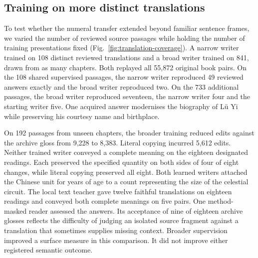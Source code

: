 \subsection*{Training on more distinct translations}
To test whether the numeral transfer extended beyond familiar sentence frames, we varied the number of reviewed source passages while holding the number of training presentations fixed (Fig.~\ref{fig:translation-coverage}). A narrow writer trained on 108 distinct reviewed translations and a broad writer trained on 841, drawn from as many chapters. Both replayed all 55,872 original book pairs. On the 108 shared supervised passages, the narrow writer reproduced 49 reviewed answers exactly and the broad writer reproduced two. On the 733 additional passages, the broad writer reproduced seventeen, the narrow writer four and the starting writer five. One acquired answer modernises the biography of L\"u Yi while preserving his courtesy name and birthplace.

On 192 passages from unseen chapters, the broader training reduced edits against the archive gloss from 9,228 to 8,383. Literal copying incurred 5,612 edits. Neither trained writer conveyed a complete meaning on the eighteen designated readings. Each preserved the specified quantity on both sides of four of eight changes, while literal copying preserved all eight. Both learned writers attached the Chinese unit for years of age to a count representing the size of the celestial circuit. The local text teacher gave twelve faithful translations on eighteen readings and conveyed both complete meanings on five pairs. One method-masked reader assessed the answers. Its acceptance of nine of eighteen archive glosses reflects the difficulty of judging an isolated source fragment against a translation that sometimes supplies missing context. Broader supervision improved a surface measure in this comparison. It did not improve either registered semantic outcome.
